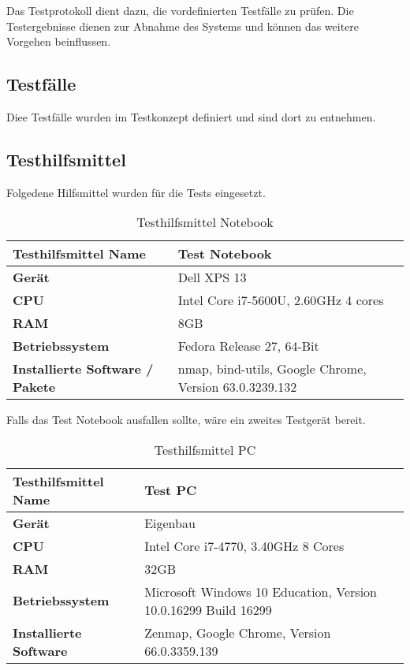 Das Testprotokoll dient dazu, die vordefinierten Testfälle zu prüfen. Die Testergebnisse dienen zur Abnahme des Systems und können das weitere Vorgehen beinflussen.

\subsection{Testfälle}
Diee Testfälle wurden im Testkonzept definiert und sind dort zu entnehmen.

\subsection{Testhilfsmittel}
Folgedene Hilfsmittel wurden für die Tests eingesetzt.

\begin{table}[H]
\centering
\begin{tabular}{p{6cm}p{10cm}}
\hline
\cellcolor{heading}\textbf{Testhilfsmittel Name} & Test Notebook \\\hline
\cellcolor{heading}\textbf{Gerät} & Dell XPS 13 \\\hline
\cellcolor{heading}\textbf{CPU} & Intel Core i7-5600U, 2.60GHz 4 cores \\\hline
\cellcolor{heading}\textbf{RAM} & 8GB \\\hline
\cellcolor{heading}\textbf{Betriebssystem} & Fedora Release 27, 64-Bit \\\hline
\cellcolor{heading}\textbf{Installierte Software / Pakete} & nmap, bind-utils, Google Chrome, Version 63.0.3239.132  \\\hline
\end{tabular}
\caption{Testhilfsmittel Notebook}
\end{table}

Falls das Test Notebook ausfallen sollte, wäre ein zweites Testgerät bereit.
\begin{table}[H]
\centering
\begin{tabular}{p{6cm}p{10cm}}
\hline
\cellcolor{heading}\textbf{Testhilfsmittel Name} & Test PC \\\hline
\cellcolor{heading}\textbf{Gerät} & Eigenbau \\\hline
\cellcolor{heading}\textbf{CPU} & Intel Core i7-4770, 3.40GHz 8 Cores \\\hline
\cellcolor{heading}\textbf{RAM} & 32GB \\\hline
\cellcolor{heading}\textbf{Betriebssystem} & Microsoft Windows 10 Education, Version 10.0.16299 Build 16299 \\\hline
\cellcolor{heading}\textbf{Installierte Software} & Zenmap, Google Chrome, Version 66.0.3359.139  \\\hline
\end{tabular}
\caption{Testhilfsmittel PC}
\end{table}
